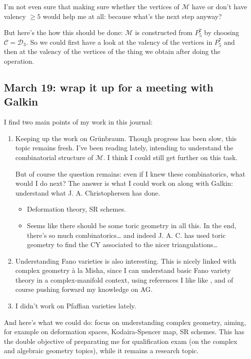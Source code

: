 \begin{remark}\leavevmode
I'm not even sure that making sure whether the vertices of \(\mathcal{M}\) have or don't have valency \(\geq 5\) would help me at all: because what's the next step anyway?
\end{remark}

But here's the how this should be done: \(\mathcal{M}\) is constructed from \(P^7_5\) by choosing \(\mathcal{C}=\mathcal{D}_3\). So we could first have a look at the valency of the vertices in \(P^7_5\) and then at the valency of the vertices of the thing we obtain after doing the operation.

\subsection{March 19: wrap it up for a meeting with Galkin}

I find two main points of my work in this journal:
\begin{enumerate}
\item Keeping up the work on Grünbraum. Though progress has been slow, this topic remains fresh. I've been reading \cite{grun} lately, intending to understand the combinatorial structure of \(\mathcal{M}\). I think I could still get further on this task.

	But of course the question remains: even if I knew these combinatorics, what would I do next? The answer is what I could work on along with Galkin: understand what J. A. Christophersen has done.
	\begin{itemize}
	\item Deformation theory, SR schemes.
	\item Seems like there should be some toric geometry in all this. In the end, there's so much combinatorics… and indeed J. A. C. has used toric geometry to find the CY associated to the nicer triangulations…
	\end{itemize}
\item Understanding Fano varieties is also interesting. This is nicely linked with complex geometry à la Misha, since I can understand basic Fano variety theory in a complex-manifold context, using references I like like \cite{lec}, and of course pushing forward my knowledge on AG.

\item I didn't work on Pfaffian varieties lately.
\end{enumerate}

And here's what we could do: focus on understanding complex geometry, aiming, for example on deformation spaces, Kodaira-Spencer map, SR schemes. This has the double objective of preparating me for qualification exam (on the complex and algebraic geometry topics), while it remains a research topic.

